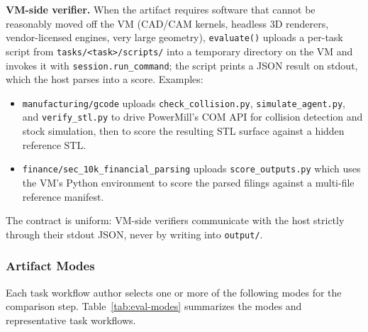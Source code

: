 \documentclass{llmxive}
\begin{document}
\noindent \textbf{VM-side verifier.}
When the artifact requires software that cannot be reasonably moved off the VM (CAD/CAM kernels, headless 3D renderers, vendor-licensed engines, very large geometry), \texttt{evaluate()} uploads a per-task script from \texttt{tasks/<task>/scripts/} into a temporary directory on the VM and invokes it with \texttt{session.run\_command}; the script prints a JSON result on stdout, which the host parses into a score. Examples:
\begin{itemize}[nosep,leftmargin=1.2em]
    \item \texttt{manufacturing/gcode} uploads \texttt{check\_collision.py}, \texttt{simulate\_agent.py}, and \texttt{verify\_stl.py} to drive PowerMill's COM API for collision detection and stock simulation, then to score the resulting STL surface against a hidden reference STL.
    \item \texttt{finance/sec\_10k\_financial\_parsing} uploads \texttt{score\_outputs.py} which uses the VM's Python environment to score the parsed filings against a multi-file reference manifest.
\end{itemize}
The contract is uniform: VM-side verifiers communicate with the host strictly through their stdout JSON, never by writing into \texttt{output/}.

\subsubsection{Artifact Modes}
\label{app:eval-modes}

Each task workflow author selects one or more of the following modes for the comparison step. Table~\ref{tab:eval-modes} summarizes the modes and representative task workflows.
\end{document}
